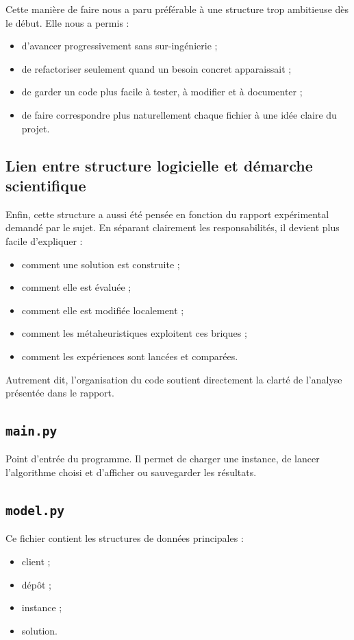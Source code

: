 \documentclass[11pt,a4paper]{article}
\begin{document}
Cette manière de faire nous a paru préférable à une structure trop ambitieuse dès le début. Elle nous a permis :
\begin{itemize}
    \item d'avancer progressivement sans sur-ingénierie ;
    \item de refactoriser seulement quand un besoin concret apparaissait ;
    \item de garder un code plus facile à tester, à modifier et à documenter ;
    \item de faire correspondre plus naturellement chaque fichier à une idée claire du projet.
\end{itemize}

\subsection{Lien entre structure logicielle et démarche scientifique}
Enfin, cette structure a aussi été pensée en fonction du rapport expérimental demandé par le sujet. En séparant clairement les responsabilités, il devient plus facile d'expliquer :
\begin{itemize}
    \item comment une solution est construite ;
    \item comment elle est évaluée ;
    \item comment elle est modifiée localement ;
    \item comment les métaheuristiques exploitent ces briques ;
    \item comment les expériences sont lancées et comparées.
\end{itemize}

Autrement dit, l'organisation du code soutient directement la clarté de l'analyse présentée dans le rapport.

\subsection{\texttt{main.py}}
Point d'entrée du programme. Il permet de charger une instance, de lancer l'algorithme choisi et d'afficher ou sauvegarder les résultats.

\subsection{\texttt{model.py}}
Ce fichier contient les structures de données principales :
\begin{itemize}
    \item client ;
    \item dépôt ;
    \item instance ;
    \item solution.
\end{itemize}
\end{document}

